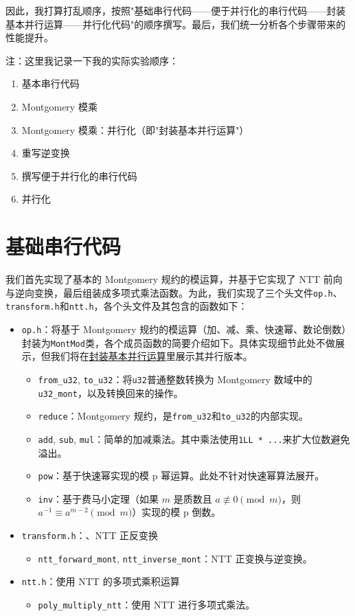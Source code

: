 \documentclass[a4paper]{article}
\begin{document}
因此，我打算打乱顺序，按照"基础串行代码——便于并行化的串行代码——封装基本并行运算——并行化代码"的顺序撰写。最后，我们统一分析各个步骤带来的性能提升。

注：这里我记录一下我的实际实验顺序：

\begin{enumerate}
    \item 基本串行代码
    \item Montgomery 模乘
    \item Montgomery 模乘：并行化（即"封装基本并行运算"）
    \item 重写逆变换
    \item 撰写便于并行化的串行代码
    \item 并行化
\end{enumerate}

\section{基础串行代码}

我们首先实现了基本的 Montgomery 规约的模运算，并基于它实现了 NTT 前向与逆向变换，最后组装成多项式乘法函数。为此，我们实现了三个头文件\texttt{op.h}、\texttt{transform.h}和\texttt{ntt.h}，各个头文件及其包含的函数如下：

\begin{itemize}
    \item \texttt{op.h}：将基于 Montgomery 规约的模运算（加、减、乘、快速幂、数论倒数）封装为\texttt{MontMod}类，各个成员函数的简要介绍如下。具体实现细节此处不做展示，但我们将在\hyperref[sec:parallel_ops]{封装基本并行运算}里展示其并行版本。
    \begin{itemize}
        \item \texttt{from\_u32}, \texttt{to\_u32}：将\texttt{u32}普通整数转换为 Montgomery 数域中的\texttt{u32\_mont}，以及转换回来的操作。
        \item \texttt{reduce}：Montgomery 规约，是\texttt{from\_u32}和\texttt{to\_u32}的内部实现。
        \item \texttt{add}, \texttt{sub}, \texttt{mul}：简单的加减乘法。其中乘法使用\texttt{1LL * ...}来扩大位数避免溢出。
        \item \texttt{pow}：基于快速幂实现的模 p 幂运算。此处不针对快速幂算法展开。
        \item \texttt{inv}：基于费马小定理（如果 \( m \) 是质数且 \( a \not\equiv 0 \pmod{m} \)，则 \( a^{-1} \equiv a^{m-2} \pmod{m} \)）实现的模 p 倒数。
    \end{itemize}
    \item \texttt{transform.h}：、NTT 正反变换
    \begin{itemize}
        \item \texttt{ntt\_forward\_mont}, \texttt{ntt\_inverse\_mont}：NTT 正变换与逆变换。
    \end{itemize}
    \item \texttt{ntt.h}：使用 NTT 的多项式乘积运算
    \begin{itemize}
        \item \texttt{poly\_multiply\_ntt}：使用 NTT 进行多项式乘法。
    \end{itemize}
\end{itemize}
\end{document}
